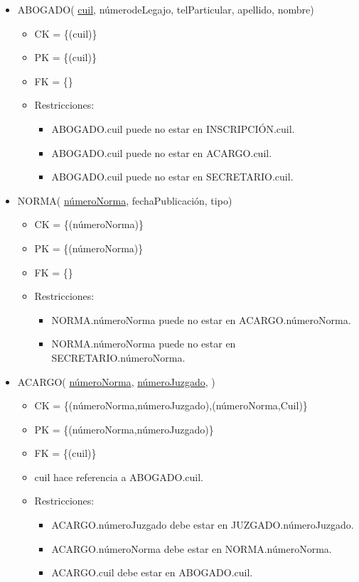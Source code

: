 \begin{itemize}
	
\item ABOGADO( \underline{cuil}, númerodeLegajo, telParticular, apellido, nombre)
	\begin{itemize}
		\item CK = \{(cuil)\}
		\item PK = \{(cuil)\}
		\item FK = \{\}
		\item Restricciones:
			\begin{itemize}
			\item ABOGADO.cuil puede no estar en INSCRIPCIÓN.cuil.
			\item ABOGADO.cuil puede no estar en ACARGO.cuil.
			\item ABOGADO.cuil puede no estar en SECRETARIO.cuil.
			\\
			\end{itemize}
	\end{itemize}

	
\item NORMA( \underline{númeroNorma}, fechaPublicación, tipo)
	\begin{itemize}
		\item CK = \{(númeroNorma)\}
		\item PK = \{(númeroNorma)\}
		\item FK = \{\}
		\item Restricciones:
			\begin{itemize}
			\item NORMA.númeroNorma puede no estar en ACARGO.númeroNorma.
			\item NORMA.númeroNorma puede no estar en SECRETARIO.númeroNorma.
			\\
			\end{itemize}
	\end{itemize}

	
\item ACARGO(  \underline{númeroNorma}, \underline{númeroJuzgado}, )
	\begin{itemize}
		\item CK = \{(númeroNorma,númeroJuzgado),(númeroNorma,Cuil)\}
		\item PK = \{(númeroNorma,númeroJuzgado)\}
		\item FK = \{(cuil)\}
		\item cuil hace referencia a ABOGADO.cuil.
		\item Restricciones:
			\begin{itemize}
			\item ACARGO.númeroJuzgado debe estar en JUZGADO.númeroJuzgado.
			\item ACARGO.númeroNorma debe estar en NORMA.númeroNorma.
			\item ACARGO.cuil debe estar en ABOGADO.cuil.
			\\
			\end{itemize}
	\end{itemize}
	

\end{itemize}
